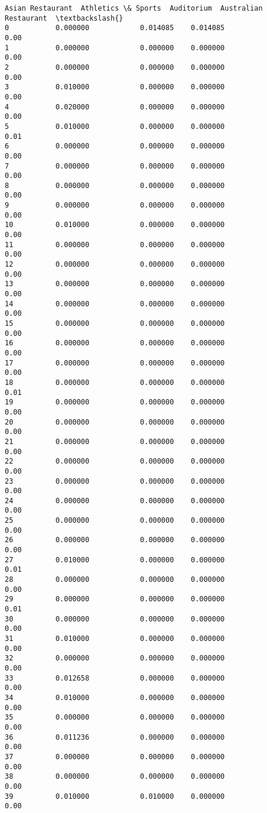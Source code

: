 \documentclass[11pt]{article}
\begin{document}
\begin{tcolorbox}[breakable, size=fbox, boxrule=.5pt, pad at break*=1mm, opacityfill=0]
\begin{Verbatim}[commandchars=\\\{\}]
    Asian Restaurant  Athletics \& Sports  Auditorium  Australian Restaurant  \textbackslash{}
0           0.000000            0.014085    0.014085                   0.00
1           0.000000            0.000000    0.000000                   0.00
2           0.000000            0.000000    0.000000                   0.00
3           0.010000            0.000000    0.000000                   0.00
4           0.020000            0.000000    0.000000                   0.00
5           0.010000            0.000000    0.000000                   0.01
6           0.000000            0.000000    0.000000                   0.00
7           0.000000            0.000000    0.000000                   0.00
8           0.000000            0.000000    0.000000                   0.00
9           0.000000            0.000000    0.000000                   0.00
10          0.010000            0.000000    0.000000                   0.00
11          0.000000            0.000000    0.000000                   0.00
12          0.000000            0.000000    0.000000                   0.00
13          0.000000            0.000000    0.000000                   0.00
14          0.000000            0.000000    0.000000                   0.00
15          0.000000            0.000000    0.000000                   0.00
16          0.000000            0.000000    0.000000                   0.00
17          0.000000            0.000000    0.000000                   0.00
18          0.000000            0.000000    0.000000                   0.01
19          0.000000            0.000000    0.000000                   0.00
20          0.000000            0.000000    0.000000                   0.00
21          0.000000            0.000000    0.000000                   0.00
22          0.000000            0.000000    0.000000                   0.00
23          0.000000            0.000000    0.000000                   0.00
24          0.000000            0.000000    0.000000                   0.00
25          0.000000            0.000000    0.000000                   0.00
26          0.000000            0.000000    0.000000                   0.00
27          0.010000            0.000000    0.000000                   0.01
28          0.000000            0.000000    0.000000                   0.00
29          0.000000            0.000000    0.000000                   0.01
30          0.000000            0.000000    0.000000                   0.00
31          0.010000            0.000000    0.000000                   0.00
32          0.000000            0.000000    0.000000                   0.00
33          0.012658            0.000000    0.000000                   0.00
34          0.010000            0.000000    0.000000                   0.00
35          0.000000            0.000000    0.000000                   0.00
36          0.011236            0.000000    0.000000                   0.00
37          0.000000            0.000000    0.000000                   0.00
38          0.000000            0.000000    0.000000                   0.00
39          0.010000            0.010000    0.000000                   0.00


\end{Verbatim}
\end{tcolorbox}
\end{document}
